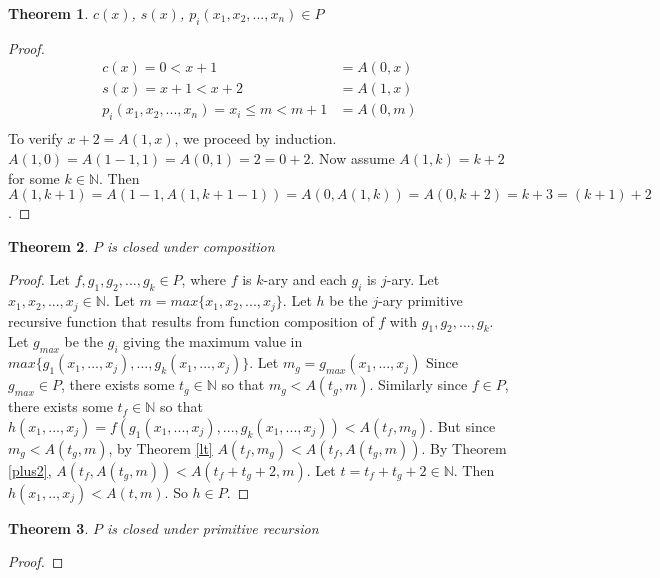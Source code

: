 \documentclass[12pt, letterpaper]{article}
\newtheorem{theorem}{Theorem}
\begin{document}
    \begin{theorem}
      $c(x)$, $s(x)$, $p_i(x_1, x_2, ..., x_n) \in P$
    \end{theorem}
    \begin{proof}
      \begin{equation*}
        \begin{aligned}
          c(x) = 0 < x + 1 &= A(0, x) \\
          s(x) = x + 1 < x + 2 &= A(1, x) \\
          p_i(x_1, x_2, ..., x_n) = x_i \leq m < m + 1 &= A(0, m) \\
        \end{aligned}
      \end{equation*}
      To verify $x + 2 = A(1, x)$, we proceed by induction. \\
      $A(1, 0) = A(1 - 1, 1) = A(0, 1) = 2 = 0 + 2$. Now assume $A(1, k) = k + 2$ for some $k \in \mathbb{N}$.
      Then $A(1, k + 1) = A(1 - 1, A(1, k + 1 - 1)) = A(0, A(1, k)) = A(0, k + 2) = k + 3 = (k + 1) + 2$.
    \end{proof}

    \begin{theorem}
      $P$ is closed under composition
    \end{theorem}
    \begin{proof}
      Let $f, g_1, g_2, ..., g_k \in P$, where $f$ is $k$-ary and each $g_i$ is $j$-ary.
      Let $x_1, x_2, ..., x_j \in \mathbb{N}$.
      Let $m = max\{x_1, x_2, ..., x_j\}$.
      Let $h$ be the $j$-ary primitive recursive function that results from function composition of $f$ with $g_1, g_2, ..., g_k$.
      Let $g_{max}$ be the $g_i$ giving the maximum value in $max\{g_1(x_1, ..., x_j), ..., g_k(x_1, ..., x_j)\}$.
      Let $m_g = g_{max}(x_1, ..., x_j)$
      Since $g_{max} \in P$, there exists some $t_g \in \mathbb{N}$ so that $m_g < A(t_g, m)$.
      Similarly since $f \in P$, there exists some $t_f \in \mathbb{N}$ so that $h(x_1, ..., x_j) = f(g_1(x_1, ..., x_j), ..., g_k(x_1, ..., x_j)) < A(t_f, m_g)$.
      But since $m_g < A(t_g, m)$, by Theorem \ref{lt} $A(t_f, m_g) < A(t_f, A(t_g, m))$.
      By Theorem \ref{plus2}, $A(t_f, A(t_g, m)) < A(t_f + t_g + 2, m)$.
      Let $t = t_f + t_g + 2 \in \mathbb{N}$.
      Then $h(x_1, .., x_j) < A(t, m)$.
      So $h \in P$.
    \end{proof}

    \begin{theorem}
      $P$ is closed under primitive recursion
    \end{theorem}
    \begin{proof}
      
    \end{proof}
\end{document}
